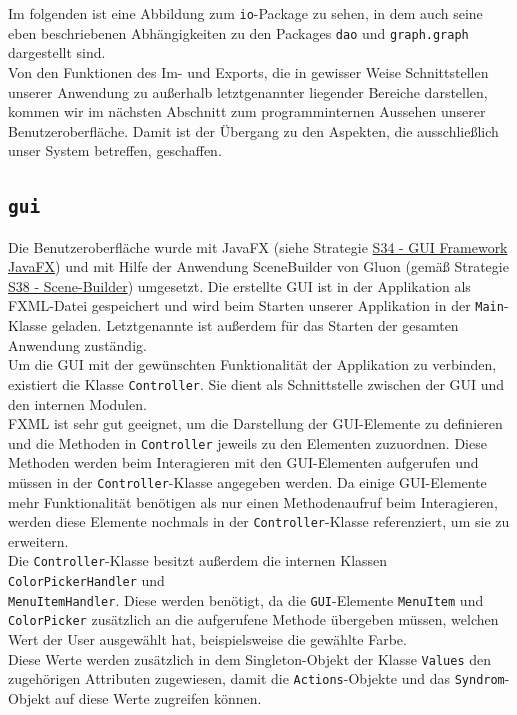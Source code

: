 \documentclass[enabledeprecatedfontcommands,fontsize=11pt,paper=a4,twoside]{scrartcl}
\newcounter{one}
\begin{document}
Im folgenden ist eine Abbildung zum \texttt{io}-Package zu sehen, in dem auch seine eben beschriebenen Abhängigkeiten zu den Packages \texttt{dao} und \texttt{graph.graph} dargestellt sind. \\ Von den Funktionen des Im- und Exports, die in gewisser Weise Schnittstellen unserer Anwendung zu außerhalb letztgenannter liegender Bereiche darstellen, kommen wir im nächsten Abschnitt zum programminternen Aussehen unserer Benutzeroberfläche. Damit ist der Übergang zu den Aspekten, die ausschließlich unser System betreffen, geschaffen.

\newpage



\subsection{\texttt{gui}}
Die Benutzeroberfläche wurde mit JavaFX (siehe Strategie \hyperlink{kkk}{S34 - GUI Framework JavaFX}) und mit Hilfe der Anwendung SceneBuilder von Gluon (gemäß Strategie \hyperlink{mmm}{S38 - Scene-Builder}) umgesetzt. Die erstellte GUI ist in der Applikation als FXML-Datei gespeichert und wird beim Starten unserer Applikation in der \texttt{Main}-Klasse geladen. Letztgenannte ist außerdem für das Starten der gesamten Anwendung zuständig. \\

Um die GUI mit der gewünschten Funktionalität der Applikation zu verbinden, existiert die Klasse \texttt{Controller}. Sie dient als Schnittstelle zwischen der GUI und den internen Modulen. \\
FXML ist sehr gut geeignet, um die Darstellung der GUI-Elemente zu definieren und die Methoden in \texttt{Controller} jeweils zu den Elementen zuzuordnen. Diese Methoden werden beim Interagieren mit den GUI-Elementen aufgerufen und müssen in der \texttt{Controller}-Klasse angegeben werden. Da einige GUI-Elemente mehr Funktionalität benötigen als nur einen Methodenaufruf beim Interagieren, werden diese Elemente nochmals in der \texttt{Controller}-Klasse referenziert, um sie zu erweitern.\\

Die \texttt{Controller}-Klasse besitzt außerdem die internen Klassen \texttt{ColorPickerHandler} und \\ \texttt{MenuItemHandler}. Diese werden benötigt, da die \texttt{GUI}-Elemente \texttt{MenuItem} und \texttt{ColorPicker} zusätzlich an die aufgerufene Methode übergeben müssen, welchen Wert der User ausgewählt hat, beispielsweise die gewählte Farbe. \\
Diese Werte werden zusätzlich in dem Singleton-Objekt der Klasse \texttt{Values} den zugehörigen Attributen zugewiesen, damit die \texttt{Actions}-Objekte und das \texttt{Syndrom}-Objekt auf diese Werte zugreifen können. \\
\end{document}
